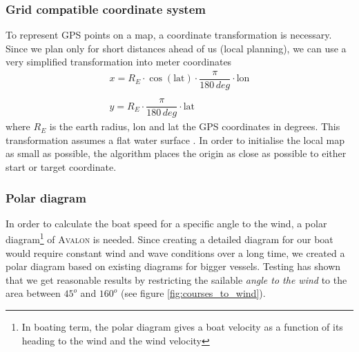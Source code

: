 \subsubsection{Grid compatible coordinate system}
To represent GPS points on a map, a coordinate transformation is necessary. Since we plan only for short distances ahead of us (local planning), we can use a very simplified transformation into meter coordinates 
\begin{equation}
\begin{array}{l}
 x = R_E \cdot \cos\left( \text{lat}\right) \cdot \dfrac{\pi}{180\, deg} \cdot \text{lon}\\
\\
 y = R_E \cdot\dfrac{\pi}{180\, deg}\cdot \text{lat}
\end{array}
\end{equation}
where $R_E$ is the earth radius, lon and lat the GPS coordinates in degrees. This transformation assumes a flat water surface \cite{stelzer2008}. In order to initialise the local map as small as possible, the algorithm places the origin as close as possible to either start or target coordinate. 
%
\subsubsection{Polar diagram}
In order to calculate the boat speed for a specific angle to the wind, a polar
diagram\footnote{In boating term, the polar diagram gives a boat velocity  as a
function of its  heading to the wind and the wind velocity} of \textsc{Avalon}
is needed.  Since creating a detailed diagram for our boat would require
constant wind and wave conditions over a long time, we created a polar diagram
based on existing diagrams for bigger vessels. Testing has shown that we get
reasonable results by restricting the sailable \textit{angle to the wind} to
the area between $45^o$ and $160^o$ (see figure \ref{fig:courses_to_wind}).
%
